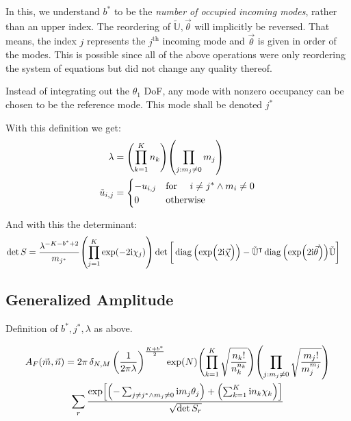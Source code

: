 \documentclass[
	english,
	a4paper,
	fontsize=10pt,
	parskip=half,
	titlepage=true,
	DIV=12,
	final
]{scrreprt}
\newcommand*{\transp}{\ensuremath{^\intercal}}
\newcommand*{\iunit}{\ensuremath{\mathrm{i}}}
\DeclareMathOperator{\diag}{diag}
\begin{document}
In this, we understand $b^*$ to be the \emph{number of occupied incoming modes}, rather than an upper index. The reordering of $\tilde{\mathbb{U}}, \vec{\theta}$ will implicitly be reversed. That means, the index $j$ represents the $j^{\text{th}}$ incoming mode and $\vec{\theta}$ is given in order of the modes. This is possible since all of the above operations were only reordering the system of equations but did not change any quality thereof.

Instead of integrating out the $\theta_1$ DoF, any mode with nonzero occupancy can be chosen to be the reference mode. This mode shall be denoted $j^*$

With this definition we get:
\begin{align}
	\lambda
&=
	\qty( \prod_{k=1}^{K}   n_k )
	\qty( \prod_{j : m_j \neq 0} m_j )
\label{eqn:DefLambdaGeneric}
\\
	\tilde{u}_{i,j} 
&=
	\begin{cases}
		-u_{i,j}		&\qq*{for } i \neq j^* \land m_i \neq 0 \\
		0			&\qotherwise*
	\end{cases}
\label{eqn:DefReducedDFTGeneric}
\end{align}

And with this the determinant:
\begin{align}
	\det S
&=
	\frac{ \lambda^{-K - b^* + 2} }{ m_{j^*} }
	\qty( \prod_{j=1}^{K} \exp(-2\iunit \chi_j) )
	\det\qty[\bigg.
		\diag\qty(\exp(\Big.2\iunit\vec{\chi}))
		-
		\tilde{\mathbb{U}}\transp
		\diag\qty(\exp(2\iunit\vec{\theta}))
		\tilde{\mathbb{U}}
	]
\label{eqn:detSGeneralized}
\end{align}

\subsection{Generalized Amplitude}
Definition of $b^*, j^*, \lambda$ as above.

\begin{multline}
	A_F(\vec{m}, \vec{n})
=
	2\pi \, \delta_{N,M} \, \qty(
		\frac{1}{2\pi\lambda}
	)^{\frac{K + b^*}{2}}
	\exp(N)
	\qty( \prod_{k=1}^{K}
		\sqrt{\frac
			{ n_k! }
			{ n_k^{n_k} }
	})
	\qty( \prod_{j : m_j \neq 0}
		\sqrt{\frac
			{ m_j! }
			{ m_j^{m_j} }
	})
\\
	\sum_r
		\frac
		{\exp[
			\qty(- \sum_{j\neq j^* \land m_j \neq 0} \iunit m_j \theta_j) + 
			\qty(  \sum_{k=1}^{K}                    \iunit n_k \chi  _k)
		]}
		{\sqrt{\det S_r}}
\end{multline}
\end{document}
